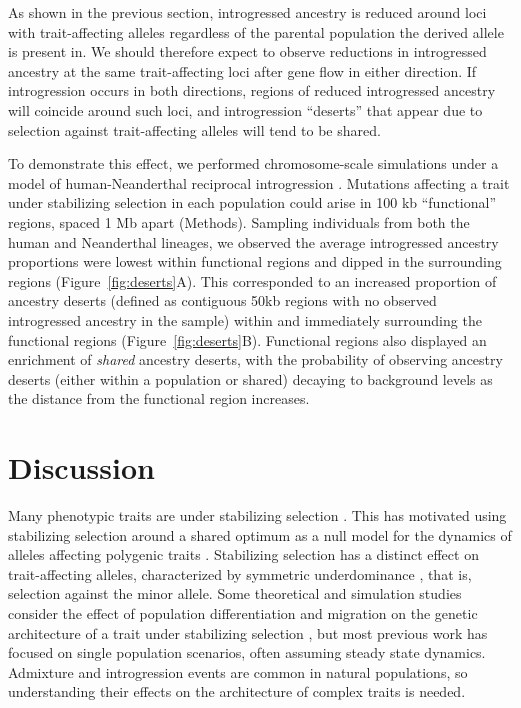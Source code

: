 \documentclass{article}
\begin{document}
As shown in the previous section, introgressed ancestry is reduced around loci
with trait-affecting alleles regardless of the parental population the derived
allele is present in. We should therefore expect to observe reductions in
introgressed ancestry at the same trait-affecting loci after gene flow in
either direction. If introgression occurs in both directions, regions of
reduced introgressed ancestry will coincide around such loci, and introgression
``deserts'' that appear due to selection against trait-affecting alleles will
tend to be shared.

To demonstrate this effect, we performed chromosome-scale simulations under a
model of human-Neanderthal reciprocal introgression
\citep[Figure~\ref{fig:human-neand-h2}A,][]{harris2023diverse}. Mutations
affecting a trait under stabilizing selection in each population could arise in
100 kb ``functional'' regions, spaced 1 Mb apart (Methods). Sampling
individuals from both the human and Neanderthal lineages, we observed the
average introgressed ancestry proportions were lowest within functional regions
and dipped in the surrounding regions (Figure~\ref{fig:deserts}A). This
corresponded to an increased proportion of ancestry deserts (defined as
    contiguous 50kb regions with no observed introgressed ancestry in the
sample) within and immediately surrounding the functional regions
(Figure~\ref{fig:deserts}B). Functional regions also displayed an enrichment of
\emph{shared} ancestry deserts, with the probability of observing ancestry
deserts (either within a population or shared) decaying to background levels as
the distance from the functional region increases.

\section*{Discussion}

Many phenotypic traits are under stabilizing selection \citep{hodgins2015gene,
sanjak2018evidence, sella2019thinking}. This has motivated using stabilizing
selection around a shared optimum as a null model for the dynamics of alleles
affecting polygenic traits \citep{yair2022population}. Stabilizing selection
has a distinct effect on trait-affecting alleles, characterized by symmetric
underdominance \citep{robertson1956effect, keightley1988quantitative}, that is,
selection against the minor allele. Some theoretical and simulation studies
consider the effect of population differentiation and migration on the genetic
architecture of a trait under stabilizing selection
\citep[e.g.,][]{tufto2000quantitative, yeaman2011genetic, yair2022population},
but most previous work has focused on single population scenarios, often
assuming steady state dynamics. Admixture and introgression events are common
in natural populations, so understanding their effects on the architecture of
complex traits is needed.
\end{document}
